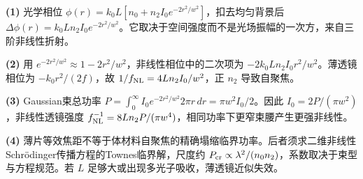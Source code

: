 \par\noindent\textbf{(1)} 光学相位 \(\phi(r)=k_0L[n_0+n_2I_0e^{-2r^2/w^2}]\)，扣去均匀背景后 \(\Delta\phi(r)=k_0Ln_2I_0e^{-2r^2/w^2}\)。它取决于空间强度而不是光场振幅的一次方，来自三阶非线性折射。
\par\noindent\textbf{(2)} 用 \(e^{-2r^2/w^2}\approx1-2r^2/w^2\)，非线性相位中的二次项为 \(-2k_0Ln_2I_0r^2/w^2\)。薄透镜相位为 \(-k_0r^2/(2f)\)，故 \(1/f_{\rm NL}=4Ln_2I_0/w^2\)，正 \(n_2\) 导致自聚焦。
\par\noindent\textbf{(3)} Gaussian束总功率 \(P=\int_0^\infty I_0e^{-2r^2/w^2}2\pi r\,dr=\pi w^2I_0/2\)。因此 \(I_0=2P/(\pi w^2)\)，非线性透镜强度 \(f_{\rm NL}^{-1}=8Ln_2P/(\pi w^4)\)，相同功率下更窄束腰产生更强非线性。
\par\noindent\textbf{(4)} 薄片等效焦距不等于体材料自聚焦的精确塌缩临界功率。后者须求二维非线性Schrödinger传播方程的Townes临界解，尺度约 \(P_{\rm cr}\propto\lambda^2/(n_0n_2)\)，系数取决于束型与方程规范。若 \(L\) 足够大或出现多光子吸收，薄透镜近似失效。
